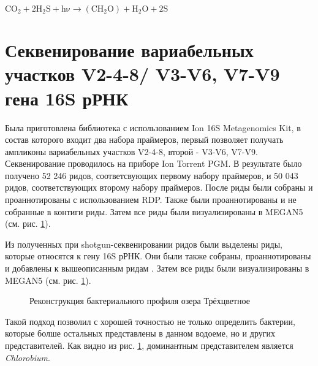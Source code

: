 \begin{center}
$\mathrm{C O_2 + 2H_2 S + h\nu \xrightarrow{} (C H_2 O) + H_2 O + 2 S}$
\end{center} 

\section{Секвенирование вариабельных участков V2-4-8/ V3-V6, V7-V9 гена 16S рРНК} \label{sect2_2}

Была приготовлена библиотека с использованием  Ion 16S Metagenomics Kit, в состав которого входит два набора праймеров, первый позволяет получать ампликоны вариабельных участков V2-4-8, второй - V3-V6, V7-V9. Секвенирование проводилось на приборе Ion Torrent PGM. В результате было получено 52 246 ридов, соответсвующих первому набору праймеров, и 50 043 ридов, соответствующих второму набору праймеров. После риды были собраны и проаннотированы с использованием RDP. Также были проаннотированы и не собранные в контиги риды. Затем все риды были визуализированы в MEGAN5 (см. рис. \ref{ris:sg+16S}). 

Из полученных при shotgun-секвенировании ридов были выделены риды, которые относятся к гену 16S рРНК. Они были также собраны, проаннотированы и добавлены к вышеописанным ридам . Затем все риды были визуализированы в MEGAN5 (см. рис. \ref{ris:sg+16S}). 

\begin{figure}[h]
\begin{minipage}[h]{0.6\linewidth}
\center{\texttt{[image: sg+16S]} \\ }
\end{minipage}
\hfill
\begin{minipage}[h]{0.5\linewidth}
\end{minipage}
\caption{Реконструкция бактериального профиля озера Трёхцветное}
\label{ris:sg+16S}
\end{figure}

Такой подход позволил с хорошей точностью не только определить бактерии, которые болше остальных представлены в данном водоеме, но и других представителей. 
Как видно из рис. \ref{ris:sg+16S}, доминантным представителем является \textit{Chlorobium}.  

\clearpage
